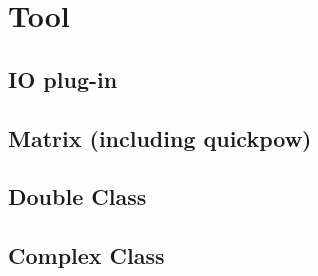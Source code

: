 \section{Tool}
\subsection{IO plug-in}


\subsection{Matrix (including quickpow)}


\subsection{Double Class}


\subsection{Complex Class}

